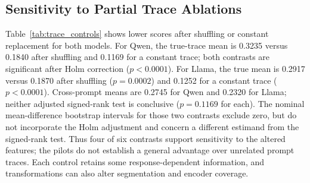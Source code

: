 \documentclass[electronics,article,submit,pdftex,moreauthors]{Definitions/mdpi}
\begin{document}
\subsection{Sensitivity to Partial Trace Ablations}
Table~\ref{tab:trace_controls} shows lower scores after shuffling or constant replacement for both models. For Qwen, the true-trace mean is 0.3235 versus 0.1840 after shuffling and 0.1169 for a constant trace; both contrasts are significant after Holm correction ($p<0.0001$). For Llama, the true mean is 0.2917 versus 0.1870 after shuffling ($p=0.0002$) and 0.1252 for a constant trace ($p<0.0001$). Cross-prompt means are 0.2745 for Qwen and 0.2320 for Llama; neither adjusted signed-rank test is conclusive ($p=0.1169$ for each). The nominal mean-difference bootstrap intervals for those two contrasts exclude zero, but do not incorporate the Holm adjustment and concern a different estimand from the signed-rank test. Thus four of six contrasts support sensitivity to the altered features; the pilots do not establish a general advantage over unrelated prompt traces. Each control retains some response-dependent information, and transformations can also alter segmentation and encoder coverage.

\begin{table}[ht]
\centering
\caption{Partial trace ablations using logged token-byte lengths from the 96-token pilot ($n=30$ prompts per model and condition). Each run decodes up to three heuristic segments with three samples per segment, 80-token T5 input and output limits, and the full stored response as reference. Intervals are percentile-bootstrap 95\% confidence intervals for the mean.}
\label{tab:trace_controls}
\end{table}
\end{document}
